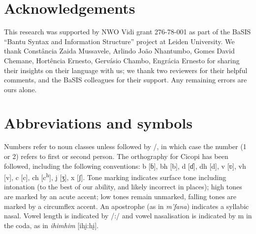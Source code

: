 \documentclass[output=paper]{langscibook}
\begin{document}
\section*{Acknowledgements}

This research was supported by NWO Vidi grant 276-78-001 as part of the BaSIS “Bantu Syntax and Information Structure” project at Leiden University. We thank Constância Zaida Mussavele, Arlindo João Nhantumbo, Gomes David Chemane, Hortência Ernesto, Gervásio Chambo, Engrácia Ernesto for sharing their insights on their language with us; we thank two reviewers for their helpful comments, and the BaSIS colleagues for their support. Any remaining errors are ours alone.

\section*{Abbreviations and symbols}

Numbers refer to noun classes unless followed by \SG{}/\PL{}, in which case the number (1 or 2) refers to first or second person. The orthography for Cicopi has been followed, including the following conventions: b [ɓ], bh [b], d [\textsf{ɗ}], dh [d], v [ʋ], vh [v], c [c], ch [c\textsuperscript{h}], j [ʒ], x [ʃ]. Tone marking indicates surface tone including intonation (to the best of our ability, and likely incorrect in places); high tones are marked by an acute accent; low tones remain unmarked, falling tones are marked by a circumflex accent. An apostrophe (as in \textit{m’fana}) indicates a syllabic nasal. Vowel length is indicated by /:/ and vowel nasalisation is indicated by m in the coda, as in \textit{ihimhim} [ihḭ:hḭ].
\end{document}
